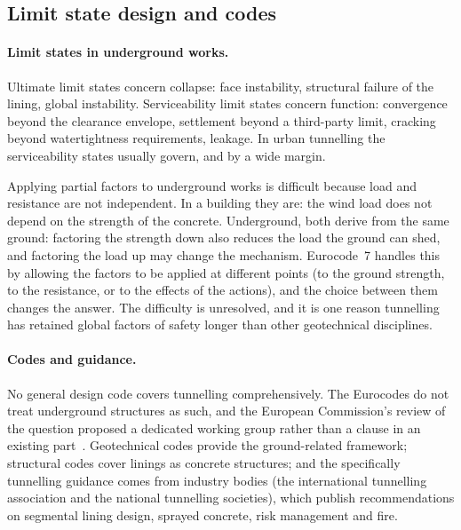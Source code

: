 \subsection{Limit state design and codes}
\label{sec:limit-state-design-and-codes}

\paragraph{Limit states in underground works.}
Ultimate limit states concern collapse: face instability, structural failure
of the lining, global instability. Serviceability limit states concern
function: convergence beyond the clearance envelope, settlement beyond a
third-party limit, cracking beyond watertightness requirements, leakage. In
urban tunnelling the serviceability states usually govern, and by a wide
margin.

Applying partial factors to underground works is difficult because load and
resistance are not independent. In a building they are: the wind load does
not depend on the strength of the concrete. Underground, both derive from the same
ground: factoring the strength down also reduces the load the ground can shed,
and factoring the load up may change the mechanism. Eurocode~7 handles this by
allowing the factors to be applied at different points (to the ground
strength, to the resistance, or to the effects of the actions), and the
choice between them changes the answer. The difficulty is unresolved,
and it is one reason tunnelling has
retained global factors of safety longer than other geotechnical disciplines.

\paragraph{Codes and guidance.}
No general design code covers tunnelling comprehensively. The Eurocodes do not
treat underground structures as such, and the European Commission's review of
the question proposed a dedicated working group rather than a clause in an
existing part~\citep{jrc2022tunnels}. Geotechnical codes provide the
ground-related framework; structural codes cover linings as concrete
structures; and the specifically tunnelling guidance comes from industry
bodies (the international tunnelling association and the national
tunnelling societies), which publish recommendations on segmental lining
design, sprayed concrete, risk management and fire.

